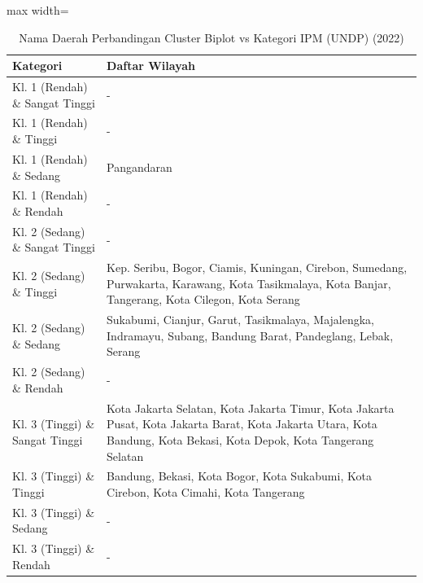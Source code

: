 \begin{table}[H]
\centering
\caption{Nama Daerah Perbandingan Cluster Biplot vs Kategori IPM (UNDP) (2022)} \label{tab:appcrossname2022}
\begin{adjustbox}{max width=\textwidth}
\begin{tabular}{|p{4cm}|p{10cm}|}
\hline
\textbf{Kategori} & \textbf{Daftar Wilayah} \\
\hline
Kl. 1 (Rendah) \& Sangat Tinggi & - \\
\hline
Kl. 1 (Rendah) \& Tinggi & - \\
\hline
Kl. 1 (Rendah) \& Sedang & Pangandaran \\
\hline
Kl. 1 (Rendah) \& Rendah & - \\
\hline
Kl. 2 (Sedang) \& Sangat Tinggi & - \\
\hline
Kl. 2 (Sedang) \& Tinggi & Kep. Seribu, Bogor, Ciamis, Kuningan, Cirebon, Sumedang, Purwakarta, Karawang, Kota Tasikmalaya, Kota Banjar, Tangerang, Kota Cilegon, Kota Serang \\
\hline
Kl. 2 (Sedang) \& Sedang & Sukabumi, Cianjur, Garut, Tasikmalaya, Majalengka, Indramayu, Subang, Bandung Barat, Pandeglang, Lebak, Serang \\
\hline
Kl. 2 (Sedang) \& Rendah & - \\
\hline
Kl. 3 (Tinggi) \& Sangat Tinggi & Kota Jakarta Selatan, Kota Jakarta Timur, Kota Jakarta Pusat, Kota Jakarta Barat, Kota Jakarta Utara, Kota Bandung, Kota Bekasi, Kota Depok, Kota Tangerang Selatan \\
\hline
Kl. 3 (Tinggi) \& Tinggi & Bandung, Bekasi, Kota Bogor, Kota Sukabumi, Kota Cirebon, Kota Cimahi, Kota Tangerang \\
\hline
Kl. 3 (Tinggi) \& Sedang & - \\
\hline
Kl. 3 (Tinggi) \& Rendah & - \\
\hline
\end{tabular}
\end{adjustbox}
\end{table}